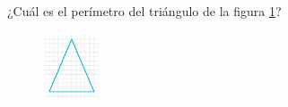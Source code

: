 ¿Cuál es el perímetro del triángulo de la figura \ref{fig:peri_isos_01}?

\begin{figure}[H]
    \centering
    \includegraphics[width=0.15\textwidth]{../images/peri_isos_01.png}
    \caption{}
    \label{fig:peri_isos_01}
\end{figure}
